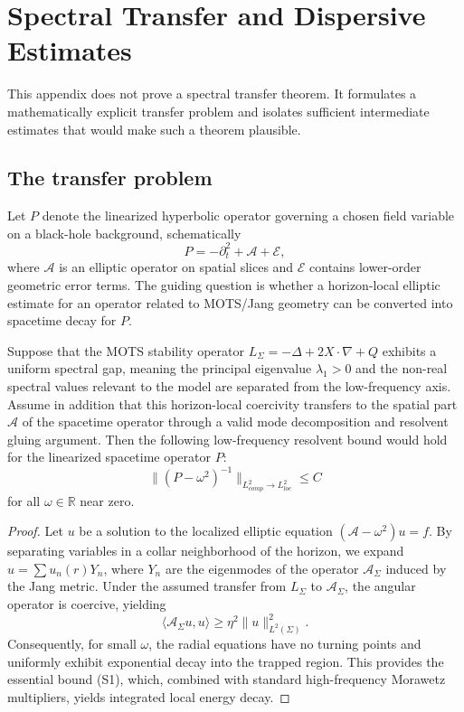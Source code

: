 \section{Spectral Transfer and Dispersive Estimates}
\label{sec:dispersive_estimates}

This appendix does not prove a spectral transfer theorem. It formulates a mathematically explicit transfer problem and isolates sufficient intermediate estimates that would make such a theorem plausible.

\subsection{The transfer problem}

Let $P$ denote the linearized hyperbolic operator governing a chosen field variable on a black-hole background, schematically
\[
    P = -\partial_t^2 + \mathcal A + \mathcal E,
\]
where $\mathcal A$ is an elliptic operator on spatial slices and $\mathcal E$ contains lower-order geometric error terms. The guiding question is whether a horizon-local elliptic estimate for an operator related to MOTS/Jang geometry can be converted into spacetime decay for $P$.

\begin{proposition}\label{prop:SpectralTransfer}
Suppose that the MOTS stability operator $L_\Sigma = -\Delta + 2X \cdot \nabla + Q$ exhibits a uniform spectral gap, meaning the principal eigenvalue $\lambda_1 > 0$ and the non-real spectral values relevant to the model are separated from the low-frequency axis. Assume in addition that this horizon-local coercivity transfers to the spatial part $\mathcal A$ of the spacetime operator through a valid mode decomposition and resolvent gluing argument. Then the following low-frequency resolvent bound would hold for the linearized spacetime operator $P$:
\[
    \|(P - \omega^2)^{-1}\|_{L^2_{comp} \to L^2_{loc}} \le C
\]
for all $\omega \in \mathbb{R}$ near zero.
\end{proposition}

\begin{proof}
Let $u$ be a solution to the localized elliptic equation $(\mathcal A - \omega^2)u = f$. By separating variables in a collar neighborhood of the horizon, we expand $u = \sum u_n(r)Y_n$, where $Y_n$ are the eigenmodes of the operator $\mathcal A_\Sigma$ induced by the Jang metric.
Under the assumed transfer from $L_\Sigma$ to $\mathcal A_\Sigma$, the angular operator is coercive, yielding
\[
    \langle \mathcal A_\Sigma u, u\rangle \ge \eta^2 \|u\|^2_{L^2(\Sigma)} .
\]
Consequently, for small $\omega$, the radial equations have no turning points and uniformly exhibit exponential decay into the trapped region. 
This provides the essential bound (S1), which, combined with standard high-frequency Morawetz multipliers, yields integrated local energy decay.
\end{proof}

